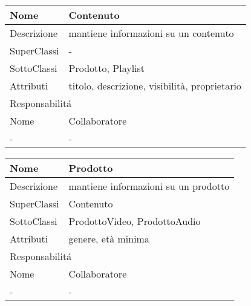 


\begin{center} %
    \begin{longtable}{ |p{3cm}|p{3cm}|p{3cm}|p{3cm}| }
        \hline
        Nome & \multicolumn{3}{|p{9cm}|}{Contenuto} \\\hline
        Descrizione & \multicolumn{3}{|p{9cm}|}{mantiene informazioni su un contenuto} \\\hline
        SuperClassi & \multicolumn{3}{|p{9cm}|}{-} \\\hline
        SottoClassi & \multicolumn{3}{|p{9cm}|}{Prodotto, Playlist} \\\hline
        Attributi & \multicolumn{3}{|p{9cm}|}{titolo, descrizione, visibilità, proprietario} \\\hline
        \multicolumn{4}{|p{12cm}|}{Responsabilit\'a} \\\hline %
        \multicolumn{2}{|p{6cm}|}{Nome} & \multicolumn{2}{|p{6cm}|}{Collaboratore} \\\hline
        \multicolumn{2}{|p{6cm}|}{-} & \multicolumn{2}{|p{6cm}|}{-} \\\hline
    \end{longtable}
\end{center}


\begin{center} %
    \begin{longtable}{ |p{3cm}|p{3cm}|p{3cm}|p{3cm}| }
        \hline
        Nome & \multicolumn{3}{|p{9cm}|}{Prodotto} \\\hline
        Descrizione & \multicolumn{3}{|p{9cm}|}{mantiene informazioni su un prodotto} \\\hline
        SuperClassi & \multicolumn{3}{|p{9cm}|}{Contenuto} \\\hline
        SottoClassi & \multicolumn{3}{|p{9cm}|}{ProdottoVideo, ProdottoAudio} \\\hline
        Attributi & \multicolumn{3}{|p{9cm}|}{genere, età minima} \\\hline
        \multicolumn{4}{|p{12cm}|}{Responsabilit\'a} \\\hline %
        \multicolumn{2}{|p{6cm}|}{Nome} & \multicolumn{2}{|p{6cm}|}{Collaboratore} \\\hline
        \multicolumn{2}{|p{6cm}|}{-} & \multicolumn{2}{|p{6cm}|}{-} \\\hline
    \end{longtable}
\end{center}


